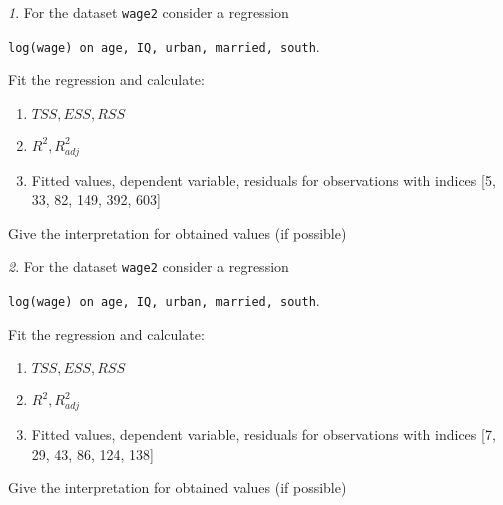 \documentclass[12pt]{article}
\theoremstyle{remark}
\newtheorem{problem}{}[section]
\begin{document}
\begin{problem}
For the dataset \texttt{wage2} consider a regression
\begin{center}
\texttt{log(wage) on age, IQ, urban, married, south}.
\end{center}
Fit the regression and calculate:
\begin{enumerate}
	\item \(TSS, ESS, RSS\)
	\item \(R^2, R^2_{adj}\)
	\item Fitted values, dependent variable, residuals 
	for observations with indices [5, 33, 82, 149, 392, 603]
\end{enumerate}
Give the interpretation for obtained values (if possible)
\end{problem}

\begin{problem}
For the dataset \texttt{wage2} consider a regression
\begin{center}
\texttt{log(wage) on age, IQ, urban, married, south}.
\end{center}
Fit the regression and calculate:
\begin{enumerate}
	\item \(TSS, ESS, RSS\)
	\item \(R^2, R^2_{adj}\)
	\item Fitted values, dependent variable, residuals 
	for observations with indices [7, 29, 43, 86, 124, 138]
\end{enumerate}
Give the interpretation for obtained values (if possible)
\end{problem}
\end{document}
